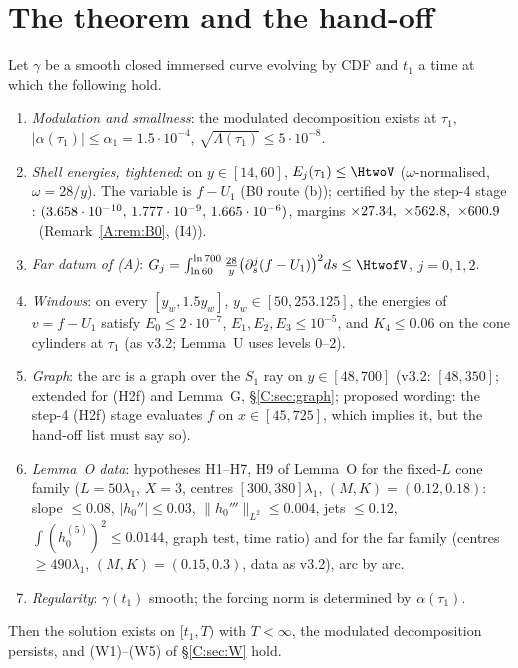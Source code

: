 \documentclass[11pt]{article}
\begin{document}
\section{The theorem and the hand-off}\label{M:sec:thm}
\begin{theorem}\label{M:thm:W}
Let $\gamma$ be a smooth closed immersed curve evolving by CDF and $t_1$ a time at which the following hold.
\begin{enumerate}[label=\textup{(H\arabic*)},leftmargin=*]
\item \emph{Modulation and smallness}: the modulated decomposition exists at $\tau_1$, $|\alpha(\tau_1)|\le\alpha_1=1.5\cdot10^{-4}$, $\sqrt{\Lambda(\tau_1)}\le5\cdot10^{-8}$.
\item \emph{Shell energies, tightened}: on $y\in[14,60]$, $E_j(\tau_1)\le\HtwoV$ ($\omega$-normalised, $\omega=28/y$).
The variable is $f-U_1$ (B0 route (b)); certified by the step-4 stage : $(3.658\cdot10^{-10},\,1.777\cdot10^{-9},\,1.665\cdot10^{-6})$, margins $\times27.34,\ \times562.8,\ \times600.9$ \tC\ (Remark~\ref{A:rem:B0}, (I4)).
\item[\textup{(H2f)}] \emph{Far datum of (A)}: $G_j=\int_{\ln60}^{\ln700}\frac{28}y\bigl(\partial_s^j(f-U_1)\bigr)^2ds\le\HtwofV$, $j=0,1,2$.
\item[\textup{(H3)}] \emph{Windows}: on every $[y_w,1.5y_w]$, $y_w\in[50,253.125]$, the energies of $v=f-U_1$ satisfy $E_0\le2\cdot10^{-7}$, $E_1,E_2,E_3\le10^{-5}$, and $K_4\le0.06$ on the cone cylinders at $\tau_1$ (as v3.2; Lemma~U uses levels $0$--$2$).
\item[\textup{(H4)}] \emph{Graph}: the arc is a graph over the $S_1$ ray on $y\in[48,700]$ (v3.2: $[48,350]$; extended for (H2f) and Lemma~G, \S\ref{C:sec:graph}; proposed wording: the step-4 (H2f) stage evaluates $f$ on $x\in[45,725]$, which implies it, but the hand-off list must say so).
\item[\textup{(H5)}] \emph{Lemma~O data}: hypotheses H1--H7, H9 of Lemma~O for the fixed-$L$ cone family ($L=50\lambda_1$, $X=3$, centres $[300,380]\lambda_1$, $(M,K)=(0.12,0.18)$: slope $\le0.08$, $|h_0''|\le0.03$, $\|h_0'''\|_{L^2}\le0.004$, jets $\le0.12$, $\int(h_0^{(5)})^2\le0.0144$, graph test, time ratio) and for the far family (centres $\ge490\lambda_1$, $(M,K)=(0.15,0.3)$, data as v3.2), arc by arc.
\item[\textup{(H6)}] \emph{Regularity}: $\gamma(t_1)$ smooth; the forcing norm is determined by $\alpha(\tau_1)$.
\end{enumerate}
Then the solution exists on $[t_1,T)$ with $T<\infty$, the modulated decomposition persists, and (W1)--(W5) of \S\ref{C:sec:W} hold.
\end{theorem}
\end{document}
